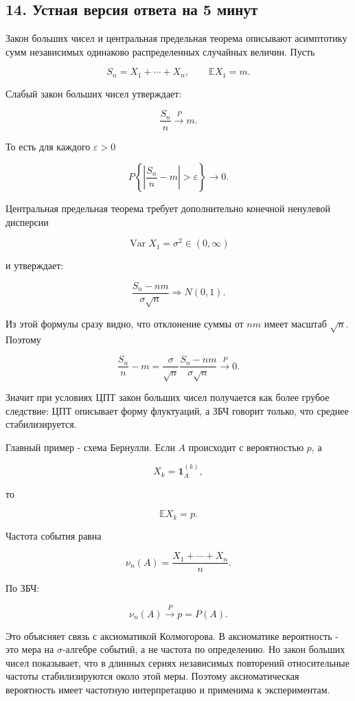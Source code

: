 \documentclass[
  11pt,
  a4paper,
]{article}
\begin{document}
\subsection{14. Устная версия ответа на 5
минут}\label{ux443ux441ux442ux43dux430ux44f-ux432ux435ux440ux441ux438ux44f-ux43eux442ux432ux435ux442ux430-ux43dux430-5-ux43cux438ux43dux443ux442}

Закон больших чисел и центральная предельная теорема описывают
асимптотику сумм независимых одинаково распределенных случайных величин.
Пусть

\[
S_n=X_1+\cdots+X_n,
\qquad
\mathbb EX_1=m.
\]

Слабый закон больших чисел утверждает:

\[
\frac{S_n}{n}\xrightarrow{P}m.
\]

То есть для каждого \(\varepsilon>0\)

\[
P\left\{\left|\frac{S_n}{n}-m\right|>\varepsilon\right\}\to0.
\]

Центральная предельная теорема требует дополнительно конечной ненулевой
дисперсии

\[
\operatorname{Var}X_1=\sigma^2\in(0,\infty)
\]

и утверждает:

\[
\frac{S_n-nm}{\sigma\sqrt n}
\Rightarrow
N(0,1).
\]

Из этой формулы сразу видно, что отклонение суммы от \(nm\) имеет
масштаб \(\sqrt n\). Поэтому

\[
\frac{S_n}{n}-m
=
\frac{\sigma}{\sqrt n}
\frac{S_n-nm}{\sigma\sqrt n}
\xrightarrow{P}0.
\]

Значит при условиях ЦПТ закон больших чисел получается как более грубое
следствие: ЦПТ описывает форму флуктуаций, а ЗБЧ говорит только, что
среднее стабилизируется.

Главный пример - схема Бернулли. Если \(A\) происходит с вероятностью
\(p\), а

\[
X_k=\mathbf 1_A^{(k)},
\]

то

\[
\mathbb EX_k=p.
\]

Частота события равна

\[
\nu_n(A)=\frac{X_1+\cdots+X_n}{n}.
\]

По ЗБЧ:

\[
\nu_n(A)\xrightarrow{P}p=P(A).
\]

Это объясняет связь с аксиоматикой Колмогорова. В аксиоматике
вероятность - это мера на \(\sigma\)-алгебре событий, а не частота по
определению. Но закон больших чисел показывает, что в длинных сериях
независимых повторений относительные частоты стабилизируются около этой
меры. Поэтому аксиоматическая вероятность имеет частотную интерпретацию
и применима к экспериментам.
\end{document}
